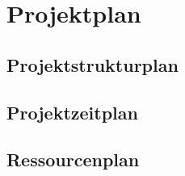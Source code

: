 \section{Projektplan}

\subsection{Projektstrukturplan}


\subsection{Projektzeitplan}


\subsection{Ressourcenplan}



